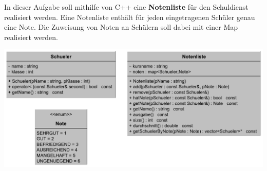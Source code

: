 \newcommand{\setfontsize}{10pt}

\lofoot{}


In dieser Aufgabe soll mithilfe von C++ eine \textbf{Notenliste} für den Schuldienst realisiert werden.
Eine Notenliste enthält für jeden eingetragenen Schüler genau eine Note.
Die Zuweisung von Noten an Schülern soll dabei mit einer Map realisiert werden.

\begin{center}
	\includegraphics[keepaspectratio,scale=0.6]{notenliste.pdf}
\end{center}

